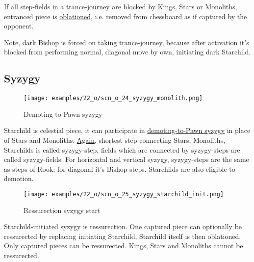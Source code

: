 If all step-fields in a trance-journey are blocked by Kings, Stars or Monoliths, entranced piece is
\hyperref[sec:Terms/Oblation]{oblationed}, i.e. removed from chessboard as if captured by the opponent.

Note, dark Bishop is forced on taking trance-journey, because after activation it's blocked from performing
normal, diagonal move by own, initiating dark Starchild.

\clearpage %

\subsection*{Syzygy}

\vspace*{-1.3\baselineskip}
\noindent
\begin{figure}[!h]
\texttt{[image: examples/22\_o/scn\_o\_24\_syzygy\_monolith.png]}
\caption{Demoting-to-Pawn syzygy}
\label{fig:scn_o_24_syzygy_monolith}
\end{figure}

Starchild is celestial piece, it can participate in
\hyperref[fig:scn_d_15_syzygy_2_stars_init]{demoting-to-Pawn syzygy} in place of Stars and Monoliths.
\hyperref[fig:scn_d_17_syzygy_2_monoliths_init]{Again}, shortest step connecting Stars, Monoliths,
Starchilds is called syzygy-step, fields which are connected by syzygy-steps are called syzygy-fields.
For horizontal and vertical syzygy, syzygy-steps are the same as steps of Rook; for diagonal it’s
Bishop steps. Starchilds are also eligible to demotion.

\clearpage %

\vspace*{-2.1\baselineskip}
\noindent
\begin{figure}[!h]
\texttt{[image: examples/22\_o/scn\_o\_25\_syzygy\_starchild\_init.png]}
\caption{Ressurection syzygy start}
\label{fig:scn_o_25_syzygy_starchild_init}
\end{figure}

Starchild-initiated syzygy is ressurection. One captured piece can optionally be ressurected by
replacing initiating Starchild, Starchild itself is then oblationed. Only captured pieces can be
ressurected. Kings, Stars and Monoliths cannot be ressurected.

